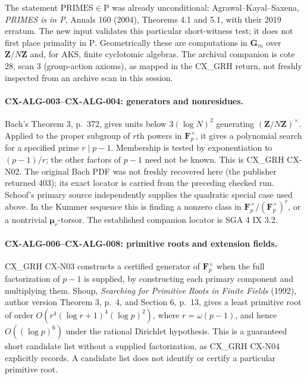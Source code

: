 The statement $\mathrm{PRIMES}\in\mathrm P$ was already unconditional:
Agrawal--Kayal--Saxena, \emph{PRIMES is in P}, Annals 160 (2004), Theorems 4.1
and 5.1, with their 2019 erratum. The new input validates this particular
short-witness test; it does not first place primality in $\mathrm P$.
Geometrically these are computations in $\mathbf G_m$ over $\mathbf Z/N\mathbf Z$
and, for AKS, finite cyclotomic algebras. The archival companion is cote 28,
scan 3 (group-action axioms), as mapped in the CX\_GRH return, not freshly
inspected from an archive scan in this session.

\paragraph{CX-ALG-003--CX-ALG-004: generators and nonresidues.}
Bach's Theorem 3, p.~372, gives units below $3(\log N)^2$ generating
$(\mathbf Z/N\mathbf Z)^\times$. Applied to the proper subgroup of $r$th
powers in $\mathbf F_p^\times$, it gives a polynomial search for a specified
prime $r\mid p-1$. Membership is tested by exponentiation to $(p-1)/r$;
the other factors of $p-1$ need not be known. This is CX\_GRH CX-N02.
The original Bach PDF was not freshly recovered here (the publisher returned
403); its exact locator is carried from the preceding checked run. Schoof's
primary source independently supplies the quadratic special case used above.
In the Kummer sequence this is finding a nonzero class in
$\mathbf F_p^\times/(\mathbf F_p^\times)^r$, or a nontrivial
$\boldsymbol\mu_r$-torsor. The established companion locator is SGA 4 IX 3.2.

\paragraph{CX-ALG-006--CX-ALG-008: primitive roots and extension fields.}
CX\_GRH CX-N03 constructs a certified generator of $\mathbf F_p^\times$ when
the full factorization of $p-1$ is supplied, by constructing each primary
component and multiplying them. Shoup, \emph{Searching for Primitive Roots
in Finite Fields} (1992), author version Theorem 3, p.~4, and Section 6,
p.~13, gives a least primitive root of order
$O(r^4(\log r+1)^4(\log p)^2)$, where $r=\omega(p-1)$,
and hence $O((\log p)^6)$ under the
rational Dirichlet hypothesis. This is a guaranteed short candidate list
without a supplied factorization, as CX\_GRH CX-N04 explicitly records.
A candidate list does not identify or certify a particular primitive root.

